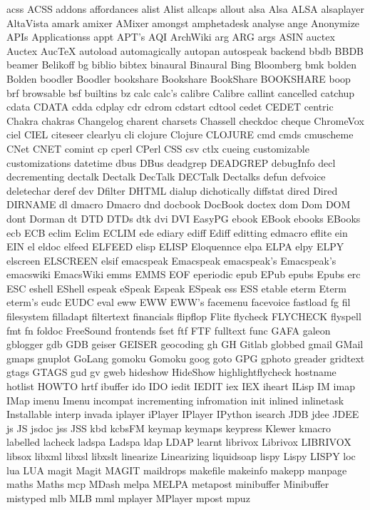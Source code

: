acss
ACSS
addons
affordances
alist
Alist
allcaps
allout
alsa
Alsa
ALSA
alsaplayer
AltaVista
amark
amixer
AMixer
amongst
amphetadesk
analyse
ange
Anonymize
APIs
Applicationss
appt
APT's
AQI
ArchWiki
arg
ARG
args
ASIN
auctex
Auctex
AucTeX
autoload
automagically
autopan
autospeak
backend
bbdb
BBDB
beamer
Belikoff
bg
biblio
bibtex
binaural
Binaural
Bing
Bloomberg
bmk
bolden
Bolden
boodler
Boodler
bookshare
Bookshare
BookShare
BOOKSHARE
boop
brf
browsable
bsf
builtins
bz
calc
calc's
calibre
Calibre
callint
cancelled
catchup
cdata
CDATA
cdda
cdplay
cdr
cdrom
cdstart
cdtool
cedet
CEDET
centric
Chakra
chakras
Changelog
charent
charsets
Chassell
checkdoc
cheque
ChromeVox
ciel
CIEL
citeseer
clearlyu
cli
clojure
Clojure
CLOJURE
cmd
cmds
cmuscheme
CNet
CNET
comint
cp
cperl
CPerl
CSS
csv
ctlx
cueing
customizable
customizations
datetime
dbus
DBus
deadgrep
DEADGREP
debugInfo
decl
decrementing
dectalk
Dectalk
DecTalk
DECTalk
Dectalks
defun
defvoice
deletechar
deref
dev
Dfilter
DHTML
dialup
dichotically
diffstat
dired
Dired
DIRNAME
dl
dmacro
Dmacro
dnd
docbook
DocBook
doctex
dom
Dom
DOM
dont
Dorman
dt
DTD
DTDs
dtk
dvi
DVI
EasyPG
ebook
EBook
ebooks
EBooks
ecb
ECB
eclim
Eclim
ECLIM
ede
ediary
ediff
Ediff
editting
edmacro
eflite
ein
EIN
el
eldoc
elfeed
ELFEED
elisp
ELISP
Eloquennce
elpa
ELPA
elpy
ELPY
elscreen
ELSCREEN
elsif
emacspeak
Emacspeak
emacspeak's
Emacspeak's
emacswiki
EmacsWiki
emms
EMMS
EOF
eperiodic
epub
EPub
epubs
Epubs
erc
ESC
eshell
EShell
espeak
eSpeak
Espeak
ESpeak
ess
ESS
etable
eterm
Eterm
eterm's
eudc
EUDC
eval
eww
EWW
EWW's
facemenu
facevoice
fastload
fg
fil
filesystem
filladapt
filtertext
financials
flipflop
Flite
flycheck
FLYCHECK
flyspell
fmt
fn
foldoc
FreeSound
frontends
fset
ftf
FTF
fulltext
func
GAFA
galeon
gblogger
gdb
GDB
geiser
GEISER
geocoding
gh
GH
Gitlab
globbed
gmail
GMail
gmaps
gnuplot
GoLang
gomoku
Gomoku
goog
goto
GPG
gphoto
greader
gridtext
gtags
GTAGS
gud
gv
gweb
hideshow
HideShow
highlightflycheck
hostname
hotlist
HOWTO
hrtf
ibuffer
ido
IDO
iedit
IEDIT
iex
IEX
iheart
ILisp
IM
imap
IMap
imenu
Imenu
incompat
incrementing
infromation
init
inlined
inlinetask
Installable
interp
invada
iplayer
iPlayer
IPlayer
IPython
isearch
JDB
jdee
JDEE
js
JS
jsdoc
jss
JSS
kbd
kcbsFM
keymap
keymaps
keypress
Klewer
kmacro
labelled
lacheck
ladspa
Ladspa
ldap
LDAP
learnt
librivox
Librivox
LIBRIVOX
libsox
libxml
libxsl
libxslt
linearize
Linearizing
liquidsoap
lispy
Lispy
LISPY
loc
lua
LUA
magit
Magit
MAGIT
maildrops
makefile
makeinfo
makepp
manpage
maths
Maths
mcp
MDash
melpa
MELPA
metapost
minibuffer
Minibuffer
mistyped
mlb
MLB
mml
mplayer
MPlayer
mpost
mpuz
